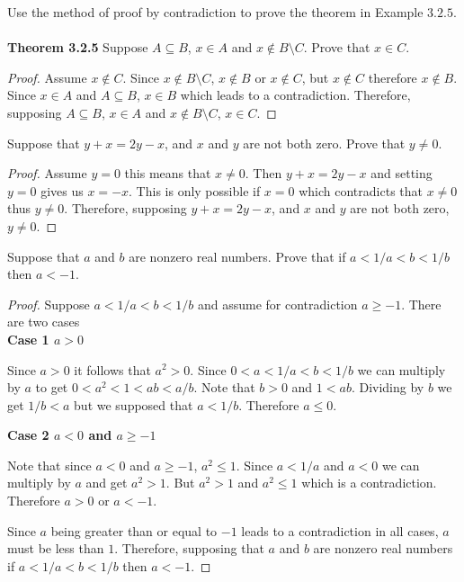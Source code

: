 \begin{tcolorbox}[title=Problem 7, breakable]
    Use the method of proof by contradiction to prove
    the theorem in Example $3.2.5$. \\ \\
    \textbf{Theorem 3.2.5} Suppose $A \subseteq B$, $x \in A$ and $x \not \in B \setminus C$.
    Prove that $x \in C$.
\end{tcolorbox}

\begin{proof}
    Assume $x \not \in C$. Since $x \not \in B \setminus C$, $x \not \in B$
    or $x \not \in C$, but $x \not \in C$ therefore $x \not \in B$. Since $x \in A$
    and $A \subseteq B$, $x \in B$ which leads to a contradiction. Therefore,
    supposing $A \subseteq B$, $x \in A$ and $x \not \in B \setminus C$, $x \in C$.
\end{proof}

\begin{tcolorbox}[title=Problem 8, breakable]
    Suppose that $y + x = 2y - x$, and $x$ and $y$ are not
    both zero. Prove that $y \not = 0$.
\end{tcolorbox}

\begin{proof}
    Assume $y = 0$ this means that $x \not = 0$. Then $y + x = 2y - x$
    and setting $y = 0$ gives us $x = -x$. This is only possible
    if $x = 0$ which contradicts that $x \not = 0$ thus $y \not = 0$. Therefore,
    supposing $y + x = 2y - x$, and $x$ and $y$ are not
    both zero, $y \not = 0$.
\end{proof}

\begin{tcolorbox}[title=Problem 9, breakable]
    Suppose that $a$ and $b$ are nonzero real numbers.
    Prove that if $a < 1/a < b < 1/b$ then $a < -1$.
\end{tcolorbox}

\begin{proof}
    Suppose $a < 1/a < b < 1/b$ and assume for contradiction $a \ge -1$.
    There are two cases \\
    \textbf{Case 1 $a > 0$}
    \begin{adjustwidth}{2em}{}
        Since $a > 0$ it follows that $a^2 > 0$. Since $0 < a < 1/a < b < 1/b$
        we can multiply by $a$ to get $0 < a^2 < 1 < ab < a/b$.
        Note that $b > 0$ and $1 < ab$. Dividing by $b$ we get 
        $1/b < a$ but we supposed that $a < 1/b$. Therefore 
        $a \le 0$.
    \end{adjustwidth}
    \textbf{Case 2 $a < 0$ and $a \ge -1$}
    \begin{adjustwidth}{2em}{}
        Note that since $a < 0$ and $a \ge -1$, $a^2 \le 1$.
        Since $a < 1/a$ and $a < 0$ we can multiply by $a$
        and get $a^2 > 1$. But $a^2 > 1$ and $a^2 \le 1$ which is a contradiction.
        Therefore $a > 0$ or $a < -1$.
    \end{adjustwidth}
    Since $a$ being greater than or equal to $-1$ leads to a contradiction in all cases,
    $a$ must be less than $1$. Therefore, supposing that $a$ and $b$ are nonzero real numbers
    if $a < 1/a < b < 1/b$ then $a < -1$.
\end{proof}


